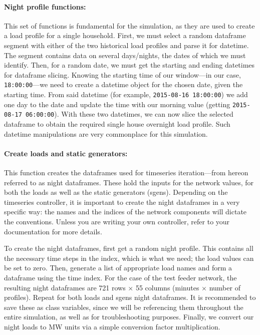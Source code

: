 \documentclass[a4paper,10pt]{report}
\begin{document}
\paragraph{Night profile functions:} This set of functions is fundamental for the simulation, as they are used to create a load profile for a single household. First, we must select a random dataframe segment with either of the two historical load profiles and parse it for datetime. The segment contains data on several days/nights, the dates of which we must identify. Then, for a random date, we must get the starting and ending datetimes for dataframe slicing. Knowing the starting time of our window---in our case, \texttt{18:00:00}---we need to create a datetime object for the chosen date, given the starting time. From said datetime (for example, \texttt{2015-08-16 18:00:00}) we add one day to the date and update the time with our morning value (getting \texttt{2015-08-17 06:00:00}). With these two datetimes, we can now slice the selected dataframe to obtain the required single house overnight load profile. Such datetime manipulations are very commonplace for this simulation.

\paragraph{Create loads and static generators:} This function creates the dataframes used for timeseries iteration---from hereon referred to as night dataframes. These hold the inputs for the network values, for both the loads as well as the static generators (sgens). Depending on the timeseries controller, it is important to create the night dataframes in a very specific way: the names and the indices of the network components will dictate the conventions. Unless you are writing your own controller, refer to your documentation for more details.

To create the night dataframes, first get a random night profile. This contains all the necessary time steps in the index, which is what we need; the load values can be set to zero. Then, generate a list of appropriate load names and form a dataframe using the time index. For the case of the test feeder network, the resulting night dataframes are 721 rows $\times$ 55 columns (minutes $\times$ number of profiles). Repeat for both loads and sgens night dataframes. It is recommended to save these as class variables, since we will be referencing them throughout the entire simulation, as well as for troubleshooting purposes. Finally, we convert our night loads to MW units via a simple conversion factor multiplication.
\end{document}
